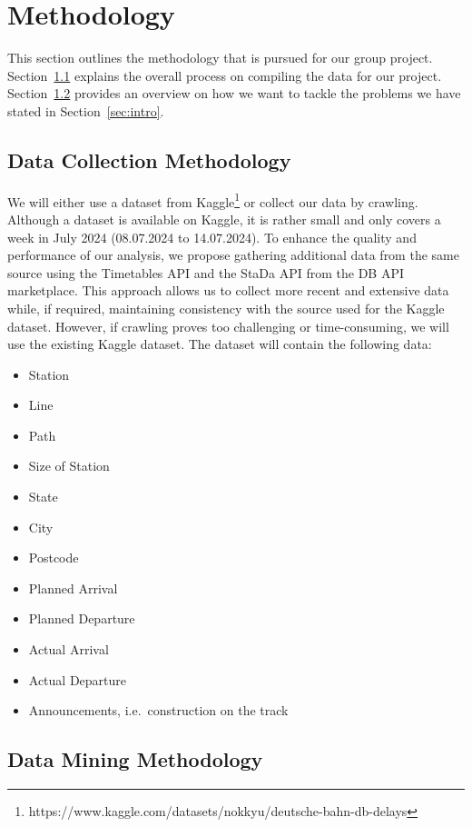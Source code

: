 \documentclass[a4paper,oneside,bibliography=totoc]{scrartcl}
\begin{document}
\section{Methodology}
\label{sec:methodology}
This section outlines the methodology that is pursued for our group project.
Section~\ref{subsec:dataset} explains the overall process on compiling the data for our project.
Section~\ref{subsec:data-mining-methodology} provides an overview
on how we want to tackle the problems we have stated in Section~\ref{sec:intro}.

\subsection{Data Collection Methodology}
\label{subsec:dataset}

We will either use a dataset from Kaggle\footnote{https://www.kaggle.com/datasets/nokkyu/deutsche-bahn-db-delays}
or collect our data by crawling.
Although a dataset is available on Kaggle, it is rather small and only covers a week in July 2024
(08.07.2024 to 14.07.2024).
To enhance the quality and performance of our analysis,
we propose
gathering additional data from the same source using the Timetables API and the StaDa API from the DB API marketplace.
This approach allows us to collect more recent and extensive data while, if required,
maintaining consistency with the source used for the Kaggle dataset.
However, if crawling proves too challenging or time-consuming, we will use the existing Kaggle dataset.
The dataset will contain the following data:

\begin{itemize}
    \item Station
    \item Line
    \item Path
    \item Size of Station
    \item State
    \item City
    \item Postcode
    \item Planned Arrival
    \item Planned Departure
    \item Actual Arrival
    \item Actual Departure
    \item Announcements, i.e.\ construction on the track
\end{itemize}


\subsection{Data Mining Methodology}
\label{subsec:data-mining-methodology}
\end{document}
